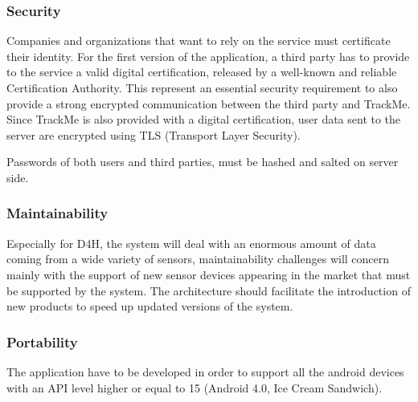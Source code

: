 \paragraph{}

{\color{Blue}\subsubsection{Security}}
Companies and organizations that want to rely on the service must certificate their identity. For the first version of the application, a third party has to provide to the service a valid digital certification, released by a well-known and reliable Certification Authority. This represent an essential security requirement to also provide a strong encrypted communication between the third party and TrackMe. Since TrackMe is also provided with a digital certification, user data sent to the server are encrypted using TLS (Transport Layer Security). \par
Passwords of both users and third parties, must be hashed and salted on server side.
\paragraph{}

{\color{Blue}\subsubsection{Maintainability}}

Especially for D4H, the system will deal with an enormous amount of data coming from a wide variety of sensors, maintainability challenges will concern mainly with the support of new sensor devices appearing in the market that must be supported by the system. The architecture should facilitate the introduction of new products to speed up updated versions of the system.
\paragraph{}

{\color{Blue}\subsubsection{Portability}}

The application have to be developed in order to support all the android devices with an API level higher or equal to 15 (Android 4.0, Ice Cream Sandwich).



